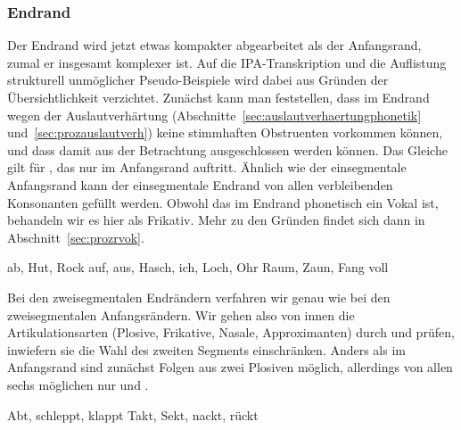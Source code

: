 \begin{exe}
	\ex\label{ex:phol777206}
	\begin{xlist}
	\end{xlist}
\end{exe}




\subsubsection{Endrand}

\label{sec:endranddeskriptiv}

Der Endrand wird jetzt etwas kompakter abgearbeitet als der Anfangsrand, zumal er insgesamt komplexer ist.
Auf die IPA-Transkription und die Auflistung strukturell unmöglicher Pseudo-Beispiele wird dabei aus Gründen der Übersichtlichkeit verzichtet.
Zunächst kann man feststellen, dass im Endrand wegen der Auslautverhärtung (Abschnitte~\ref{sec:auslautverhaertungphonetik} und~\ref{sec:prozauslautverh}) keine stimmhaften Obstruenten vorkommen können, und dass damit \textipa{[b d g v z J]} aus der Betrachtung ausgeschlossen werden können.
Das Gleiche gilt für \textipa{[h]}, das nur im Anfangsrand auftritt.
Ähnlich wie der einsegmentale Anfangsrand kann der einsegmentale Endrand von allen verbleibenden Konsonanten gefüllt werden.
Obwohl das \textipa{[K]} im Endrand phonetisch ein Vokal ist, behandeln wir es hier als Frikativ.
Mehr zu den Gründen findet sich dann in Abschnitt~\ref{sec:prozrvok}.

\begin{exe}
  \ex\label{ex:phol4711}
  \begin{xlist}
  	\ex ab, Hut, Rock
  	\ex auf, aus, Hasch, ich, Loch, Ohr
  	\ex Raum, Zaun, Fang
  	\ex voll
  \end{xlist}
\end{exe}

Bei den zweisegmentalen Endrändern verfahren wir genau wie bei den zweisegmentalen Anfangsrändern.
Wir gehen also von innen die Artikulationsarten (Plosive, Frikative, Nasale, Approximanten) durch und prüfen, inwiefern sie die Wahl des zweiten Segments einschränken.
Anders als im Anfangsrand sind zunächst Folgen aus zwei Plosiven möglich, allerdings von allen sechs möglichen nur \textipa{[pt]} und \textipa{[kt]}.

\begin{exe}
  \ex\label{ex:phol4712}
  \begin{xlist}
  	\ex Abt, schleppt, klappt
  	\ex Takt, Sekt, nackt, rückt
  \end{xlist}
\end{exe}

